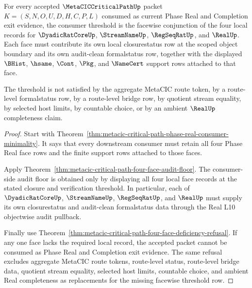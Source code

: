 \begin{theorem}
\label{thm:metacic-critical-path-l10-four-face-consumer-threshold}
For every accepted $\MetaCICCriticalPathUp$ packet $K=(S,N,O,U,D,H,C,P,L)$ consumed as current Phase Real and Completion exit evidence, the consumer threshold is the facewise conjunction of the four local records for $\DyadicRatCoreUp$, $\StreamNameUp$, $\RegSeqRatUp$, and $\RealUp$. Each face must contribute its own local closurestatus row at the scoped object boundary and its own audit-clean formalstatus row, together with the displayed $\BHist$, $\hsame$, $\Cont$, $\Pkg$, and $\NameCert$ support rows attached to that face.

The threshold is not satisfied by the aggregate MetaCIC route token, by a route-level formalstatus row, by a route-level bridge row, by quotient stream equality, by selected host limits, by countable choice, or by an ambient $\RealUp$ completeness claim.
\end{theorem}
\begin{proof}
Start with Theorem~\ref{thm:metacic-critical-path-phase-real-consumer-minimality}. It says that every downstream consumer must retain all four Phase Real face rows and the finite support rows attached to those faces.

Apply Theorem~\ref{thm:metacic-critical-path-four-face-audit-floor}. The consumer-side audit floor is obtained only by displaying all four local face records at the stated closure and verification threshold. In particular, each of $\DyadicRatCoreUp$, $\StreamNameUp$, $\RegSeqRatUp$, and $\RealUp$ must supply its own closurestatus and audit-clean formalstatus data through the Real L10 objectwise audit pullback.

Finally use Theorem~\ref{thm:metacic-critical-path-four-face-deficiency-refusal}. If any one face lacks the required local record, the accepted packet cannot be consumed as Phase Real and Completion exit evidence. The same refusal excludes aggregate MetaCIC route tokens, route-level status, route-level bridge data, quotient stream equality, selected host limits, countable choice, and ambient Real completeness as replacements for the missing facewise threshold row.
\end{proof}


